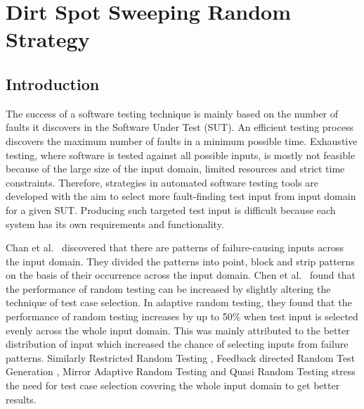 \chapter{Dirt Spot Sweeping Random Strategy}
\label{chap:DSSR}

\section{Introduction}\label{sec:intro4}
The success of a software testing technique is mainly based on the number of faults it discovers in the Software Under Test (SUT). An efficient testing process discovers the maximum number of faults in a minimum possible time. Exhaustive testing, where software is tested against all possible inputs, is mostly not feasible because of the large size of the input domain, limited resources and strict time constraints. Therefore, strategies in automated software testing tools are developed with the aim to select more fault-finding test input from input domain for a given SUT. Producing such targeted test input is difficult because each system has its own requirements and functionality.

Chan et al.~\cite{Chan1996} discovered that there are patterns of failure-causing inputs across the input domain. They divided the patterns into point, block and strip patterns on the basis of their occurrence across the input domain. Chen et al.~\cite{Chen2008} found that the performance of random testing can be increased by slightly altering the technique of test case selection. In adaptive random testing, they found that the performance of random testing increases by up to 50\% when test input is selected evenly across the whole input domain. This was mainly attributed to the better distribution of input which increased the chance of selecting inputs from failure patterns. Similarly Restricted Random Testing \cite{Chan2002}, Feedback directed Random Test Generation \cite{Pacheco2007}, Mirror Adaptive Random Testing \cite{Chen2003} and Quasi Random Testing \cite{Chen2005} stress the need for test case selection covering the whole input domain to get better results.

